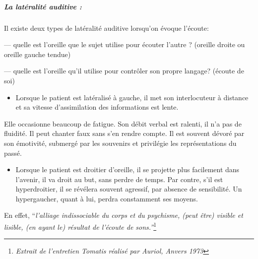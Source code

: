 \subparagraph{La latéralité auditive : }

Il existe deux types de latéralité auditive lorsqu'on évoque l'écoute:


--- quelle est l'oreille que le sujet utilise pour écouter l'autre ?
(oreille droite ou oreille gauche tendue)

--- quelle est l'oreille qu'il utilise pour contrôler son propre langage?
(écoute de soi)


\begin{itemize}
\item Lorsque le patient est latéralisé à gauche, il met son interlocuteur
à distance et sa vitesse d'assimilation des informations est lente.
\end{itemize}
Elle occasionne beaucoup de fatigue. Son débit verbal est ralenti,
il n'a pas de fluidité. Il peut chanter faux sans s'en rendre compte.
Il est souvent dévoré par son émotivité, submergé par les souvenirs
et privilégie les représentations du passé.
\begin{itemize}
\item Lorsque le patient est droitier d'oreille, il se projette plus facilement
dans l'avenir, il va droit au but, sans perdre de temps. Par contre,
s'il est hyperdroitier, il se révélera souvent agressif, par absence
de sensibilité. Un hypergaucher, quant à lui, perdra constamment ses
moyens.
\end{itemize}



En effet, ``\emph{l'alliage indissociable du corps et du psychisme, (peut être)
visible et lisible, (en ayant le) résultat de l'écoute de sons.''}\footnote{\emph{Extrait de l'entretien Tomatis réalisé par Auriol, Anvers 1973}}

